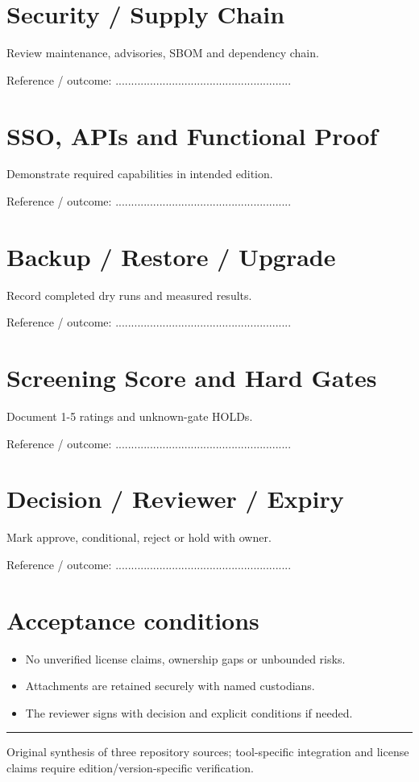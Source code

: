\documentclass[10pt,letterpaper]{article}
\begin{document}
\section{Security / Supply Chain}
Review maintenance, advisories, SBOM and dependency chain.\par
Reference / outcome: ........................................................\par
\section{SSO, APIs and Functional Proof}
Demonstrate required capabilities in intended edition.\par
Reference / outcome: ........................................................\par
\section{Backup / Restore / Upgrade}
Record completed dry runs and measured results.\par
Reference / outcome: ........................................................\par
\section{Screening Score and Hard Gates}
Document 1-5 ratings and unknown-gate HOLDs.\par
Reference / outcome: ........................................................\par
\section{Decision / Reviewer / Expiry}
Mark approve, conditional, reject or hold with owner.\par
Reference / outcome: ........................................................\par
\section{Acceptance conditions}
\begin{itemize}
\item No unverified license claims, ownership gaps or unbounded risks.
\item Attachments are retained securely with named custodians.
\item The reviewer signs with decision and explicit conditions if needed.
\end{itemize}
\vfill\noindent\color{muted}\rule{\linewidth}{0.4pt}\par\scriptsize Original synthesis of three repository sources; tool-specific integration and license claims require edition/version-specific verification.\normalsize
\end{document}
